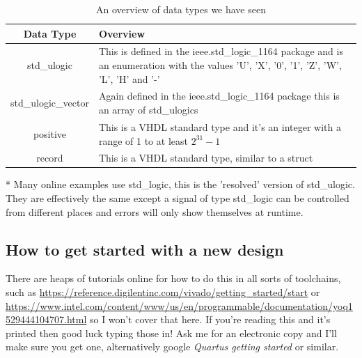 \documentclass[11pt,a4paper]{article}
\begin{document}
\begin{table}[H]
    \begin{center}
    \begin{threeparttable}
        \begin{tabular}{| c | m{ } |}
            \hline
             Data Type & Overview \\ \hline
             std\_ulogic \tnote{*}& This is defined in the ieee.std\_logic\_1164 package and is an enumeration with the values 'U', 'X', '0', '1', 'Z', 'W', 'L', 'H' and '-' \\ \hline
             std\_ulogic\_vector & Again defined in the ieee.std\_logic\_1164 package this is an array of std\_ulogics \\ \hline
             positive & This is a VHDL standard type and it's an integer with a range of 1 to at least $2^{31} -1$  \\ \hline
             record & This is a VHDL standard type, similar to a struct \\ \hline
        \end{tabular}
        \begin{tablenotes}
        \footnotesize
        \item[*] Many online examples use std\_logic, this is the 'resolved' version of std\_ulogic. They are effectively the same except a signal of type std\_logic can be controlled from different places and errors will only show themselves at runtime.
        \end{tablenotes}
        \end{threeparttable}
        \caption{An overview of data types we have seen}
        \label{table:datatypes}
    \end{center}
\end{table}

\subsection{How to get started with a new design}
There are heaps of tutorials online for how to do this in all sorts of toolchains, such as \url{https://reference.digilentinc.com/vivado/getting_started/start} or \url{https://www.intel.com/content/www/us/en/programmable/documentation/yoq1529444104707.html} so I won't cover that here. If you're reading this and it's printed then good luck typing those in! Ask me for an electronic copy and I'll make sure you get one, alternatively google \emph{Quartus getting started} or similar.
\end{document}
